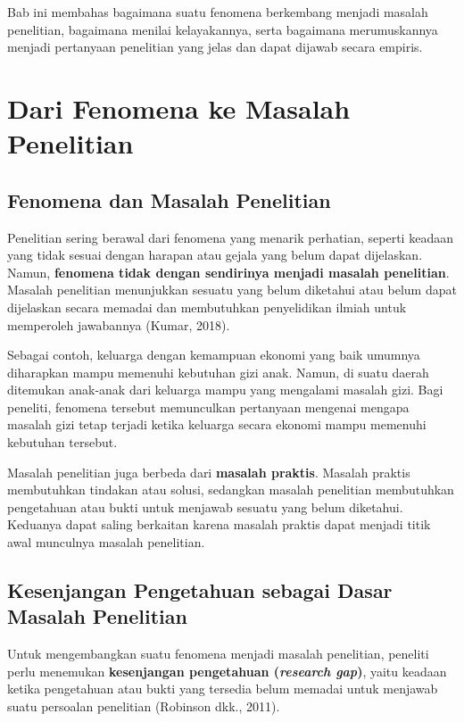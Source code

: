 \documentclass[
  indonesian,
  letterpaper,
  DIV=11,
  numbers=noendperiod]{scrreprt}
\begin{document}
Bab ini membahas bagaimana suatu fenomena berkembang menjadi masalah
penelitian, bagaimana menilai kelayakannya, serta bagaimana
merumuskannya menjadi pertanyaan penelitian yang jelas dan dapat dijawab
secara empiris.

\section{Dari Fenomena ke Masalah
Penelitian}\label{dari-fenomena-ke-masalah-penelitian}

\subsection{Fenomena dan Masalah
Penelitian}\label{fenomena-dan-masalah-penelitian}

Penelitian sering berawal dari fenomena yang menarik perhatian, seperti
keadaan yang tidak sesuai dengan harapan atau gejala yang belum dapat
dijelaskan. Namun, \textbf{fenomena tidak dengan sendirinya menjadi
masalah penelitian}. Masalah penelitian menunjukkan sesuatu yang belum
diketahui atau belum dapat dijelaskan secara memadai dan membutuhkan
penyelidikan ilmiah untuk memperoleh jawabannya (Kumar, 2018).

Sebagai contoh, keluarga dengan kemampuan ekonomi yang baik umumnya
diharapkan mampu memenuhi kebutuhan gizi anak. Namun, di suatu daerah
ditemukan anak-anak dari keluarga mampu yang mengalami masalah gizi.
Bagi peneliti, fenomena tersebut memunculkan pertanyaan mengenai mengapa
masalah gizi tetap terjadi ketika keluarga secara ekonomi mampu memenuhi
kebutuhan tersebut.

Masalah penelitian juga berbeda dari \textbf{masalah praktis}. Masalah
praktis membutuhkan tindakan atau solusi, sedangkan masalah penelitian
membutuhkan pengetahuan atau bukti untuk menjawab sesuatu yang belum
diketahui. Keduanya dapat saling berkaitan karena masalah praktis dapat
menjadi titik awal munculnya masalah penelitian.

\subsection{Kesenjangan Pengetahuan sebagai Dasar Masalah
Penelitian}\label{kesenjangan-pengetahuan-sebagai-dasar-masalah-penelitian}

Untuk mengembangkan suatu fenomena menjadi masalah penelitian, peneliti
perlu menemukan \textbf{kesenjangan pengetahuan (\emph{research gap})},
yaitu keadaan ketika pengetahuan atau bukti yang tersedia belum memadai
untuk menjawab suatu persoalan penelitian (Robinson dkk., 2011).
\end{document}
